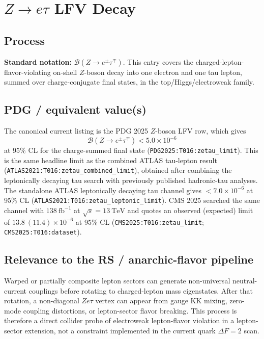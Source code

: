 
\section{\texorpdfstring{\(Z\to e\tau\)}{Z -> e tau} LFV Decay}

\subsection*{Process}
\textbf{Standard notation:} \(\mathcal{B}(Z\to e^\pm\tau^\mp)\).
This entry covers the charged-lepton-flavor-violating on-shell \(Z\)-boson
decay into one electron and one tau lepton, summed over charge-conjugate final
states, in the top/Higgs/electroweak family.

\subsection*{PDG / equivalent value(s)}
The canonical current listing is the PDG 2025 \(Z\)-boson LFV row, which gives
\[
  \mathcal{B}(Z\to e^\pm\tau^\mp) < 5.0\times 10^{-6}
\]
at 95\% CL for the charge-summed final state
(\texttt{PDG2025:T016:zetau\_limit}).  This is the same headline limit as the
combined ATLAS tau-lepton result
(\texttt{ATLAS2021:T016:zetau\_combined\_limit}), obtained after combining
the leptonically decaying tau search with previously published hadronic-tau
analyses.  The standalone ATLAS leptonically decaying tau channel gives
\(<7.0\times10^{-6}\) at 95\% CL
(\texttt{ATLAS2021:T016:zetau\_leptonic\_limit}).  CMS 2025 searched the same
channel with \(138~\mathrm{fb}^{-1}\) at \(\sqrt{s}=13~\mathrm{TeV}\) and
quotes an observed (expected) limit of
\(13.8~(11.4)\times10^{-6}\) at 95\% CL
(\texttt{CMS2025:T016:zetau\_limit}; \texttt{CMS2025:T016:dataset}).

\subsection*{Relevance to the RS / anarchic-flavor pipeline}
Warped or partially composite lepton sectors can generate non-universal
neutral-current couplings before rotating to charged-lepton mass eigenstates.
After that rotation, a non-diagonal \(Z e\tau\) vertex can appear from gauge
KK mixing, zero-mode coupling distortions, or lepton-sector flavor breaking.
This process is therefore a direct collider probe of electroweak lepton-flavor
violation in a lepton-sector extension, not a constraint implemented in the
current quark \(\Delta F=2\) scan.

